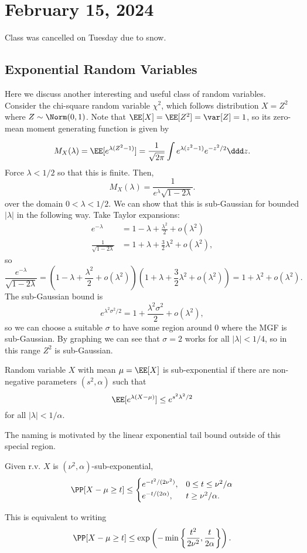 \section{February 15, 2024}

Class was cancelled on Tuesday due to snow. 

\subsection{Exponential Random Variables}

Here we discuss another interesting and useful class of random variables. Consider the chi-square random variable $\chi^2$, which follows distribution $X=Z^2$ where $Z\sim \Norm(0,1)$. Note that $\EE[X] = \EE[Z^2] = \var[Z] = 1$, so its zero-mean moment generating function is given by 

\[M_X(\lambda) = \EE[e^{\lambda(Z^2-1)}] = \frac{1}{\sqrt{2\pi}}\int e^{\lambda(z^2-1)}e^{-z^2/2}\ddd z.\]
Force $\lambda < 1/2$ so that this is finite. Then, 
\[M_X(\lambda) = \frac{1}{e^{\lambda}\sqrt{1-2\lambda}}. \] 
over the domain $0 < \lambda < 1/2$. We can show that this is sub-Gaussian for bounded $\vert \lambda\vert$ in the following way. Take Taylor expansions: 
\begin{align*}
	e^{-\lambda} &= 1 - \lambda + \frac{\lambda^2}{2} + o(\lambda^2) \\
	\frac{1}{\sqrt{1-2\lambda}} &= 1 + \lambda + \frac{3}{2}\lambda^2 + o(\lambda^2),
\end{align*} 
so 
\[\frac{e^{-\lambda}}{\sqrt{1-2\lambda}} = (1-\lambda + \frac{\lambda^2}{2} + o(\lambda^2))(1 + \lambda + \frac{3}{2}\lambda^2 + o(\lambda^2)) = 1 + \lambda^2 + o(\lambda^2).\]
The sub-Gaussian bound is 
\[e^{\lambda^2\sigma^2/2} = 1 + \frac{\lambda^2\sigma^2}{2} + o(\lambda^2),\] 
so we can choose a suitable $\sigma$ to have some region around $0$ where the MGF is sub-Gaussian. By graphing we can see that $\sigma=2$ works for all $\vert \lambda\vert < 1/4$, so in this range $Z^2$ is sub-Gaussian.

\begin{definition}

Random variable $X$ with mean $\mu = \EE[X]$ is \ac{sub-exponential} if there are non-negative parameters $(s^2,\alpha)$ such that 
\[\EE[e^{\lambda(X-\mu)}]\leq e^{s^2\lambda^2/2}\]
for all $\vert \lambda\vert < 1/\alpha$. 
\end{definition}
The naming is motivated by the linear exponential tail bound outside of this special region. 
\begin{theorem}
\lemlabel

Given r.v. $X$ is $(\nu^2,\alpha)$-sub-exponential, 
\[\PP[X-\mu\geq t]\leq \begin{cases}
	e^{-t^2/(2\nu^2)}, & 0\leq t\leq \nu^2/\alpha \\
	e^{-t/(2\alpha)}, & t\geq \nu^2/\alpha.
\end{cases}\] 
\end{theorem}
This is equivalent to writing 
\[\PP[X-\mu\geq t]\leq \exp\left(-\min\left\{\frac{t^2}{2\nu^2}, \frac{t}{2\alpha}\right\}\right).\]

